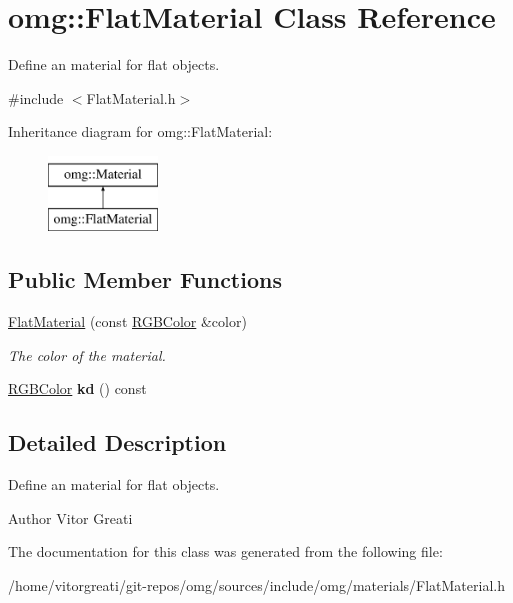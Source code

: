 \hypertarget{classomg_1_1_flat_material}{}\section{omg\+::Flat\+Material Class Reference}
\label{classomg_1_1_flat_material}


Define an material for flat objects.  




{\ttfamily \#include $<$Flat\+Material.\+h$>$}

Inheritance diagram for omg\+::Flat\+Material\+:\begin{figure}[H]
\begin{center}
\leavevmode
\includegraphics[height=2.000000cm]{classomg_1_1_flat_material}
\end{center}
\end{figure}
\subsection*{Public Member Functions}
\begin{DoxyCompactItemize}
\item 
\mbox{\label{classomg_1_1_flat_material_a1eabbe2e689f8f08caeea6fbe8a6e4f3}} 
\mbox{\hyperlink{classomg_1_1_flat_material_a1eabbe2e689f8f08caeea6fbe8a6e4f3}{Flat\+Material}} (const \mbox{\hyperlink{namespaceomg_a7b0e3f3dcf76f2b4758c314a41885917}{R\+G\+B\+Color}} \&color)
\begin{DoxyCompactList}\small\item\em The color of the material. \end{DoxyCompactList}\item 
\mbox{\label{classomg_1_1_flat_material_a3a8e4d6f3b8467601edd527b818332da}} 
\mbox{\hyperlink{namespaceomg_a7b0e3f3dcf76f2b4758c314a41885917}{R\+G\+B\+Color}} {\bfseries kd} () const
\end{DoxyCompactItemize}


\subsection{Detailed Description}
Define an material for flat objects. 

\begin{DoxyAuthor}{Author}
Vitor Greati 
\end{DoxyAuthor}


The documentation for this class was generated from the following file\+:\begin{DoxyCompactItemize}
\item 
/home/vitorgreati/git-\/repos/omg/sources/include/omg/materials/Flat\+Material.\+h\end{DoxyCompactItemize}
